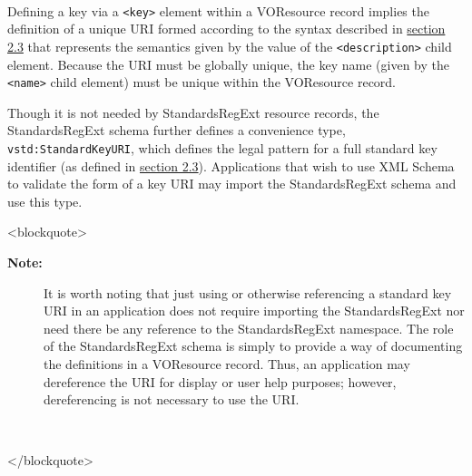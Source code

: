 \documentclass[11pt,a4paper]{ivoa}
\begin{document}
{{\begin{table}
\begin{tabular}[FIXTHIS]
\begin{table}
\begin{tabular}[FIXTHIS]
\end{tabular}
\end{table}
\\

\end{tabular}
\end{table}



Defining a key via a \texttt{<key>} element within a
VOResource record implies the definition of a unique URI formed
according to the syntax described in \href{#sec:keys}{section
2.3} that represents the semantics given by the value of the 
\texttt{<description>} child element.  Because the URI must
be globally unique, the key name (given by the
\texttt{<name>} child element) must be unique within the
VOResource record.



Though it is not needed by StandardsRegExt resource records, the StandardsRegExt
schema further defines a convenience type,
\texttt{vstd:StandardKeyURI}, which defines the legal pattern for
a full standard key identifier (as defined in
\href{#sec:keys}{section 2.3}).  Applications that wish to use
XML Schema to validate the form of a key URI may import the StandardsRegExt
schema and use this type.  





<blockquote>
\begin{table}
\begin{tabular}[FIXTHIS]

\begin{description}
\item[\textbf{Note:}] It is worth noting that just using or otherwise referencing a
       standard key URI in an application does not require importing
       the StandardsRegExt nor need there be any reference to the
       StandardsRegExt namespace.  The role of the StandardsRegExt schema is
       simply to provide a way of documenting the definitions in a
       VOResource record.  Thus, an application may dereference the
       URI for display or user help purposes; however, dereferencing
       is not necessary to use the URI. 

\end{description}

\\

\end{tabular}
\end{table}
</blockquote>

}}
\end{document}
